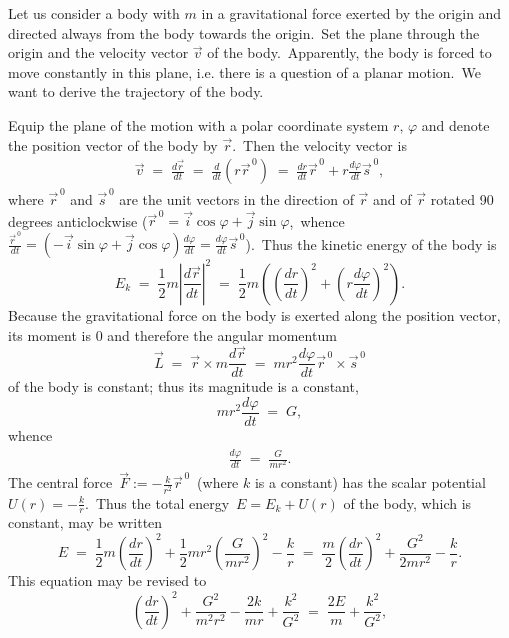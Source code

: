 \documentclass[12pt]{article}
\begin{document}
  
  
Let us consider a body with  $m$ in a gravitational force  exerted by the origin and directed always from the body towards the origin.\, Set the plane through the origin and the velocity vector $\vec{v}$ of the body.\, Apparently, the body is forced to move constantly in this plane, i.e. there is a question of a planar motion.\, We want to derive the trajectory of the body.

Equip the plane of the motion with a polar coordinate system $r,\,\varphi$ and denote the position vector of the body by $\vec{r}$.\, Then the velocity vector is
\begin{align}
\vec{v} \;=\; \frac{d\vec{r}}{dt} \;=\; \frac{d}{dt}(r\vec{r}^{\,0}) 
\;=\; \frac{dr}{dt}\vec{r}^{\,0}+r\frac{d\varphi}{dt}\vec{s}^{\,0},
\end{align}
where $\vec{r}^{\,0}$ and $\vec{s}^{\,0}$ are the unit vectors in the direction of $\vec{r}$ and of $\vec{r}$ rotated 90 degrees anticlockwise ($\vec{r}^{\,0} = \vec{i}\cos\varphi+\vec{j}\sin\varphi$,\, whence\, $\frac{\vec{r}^{\,0}}{dt} = 
(-\vec{i}\sin\varphi+\vec{j}\cos\varphi)\frac{d\varphi}{dt} = \frac{d\varphi}{dt}\vec{s}^{\,0}$).\, Thus the kinetic energy of the body is
$$E_k \;=\; \frac{1}{2}m\left|\frac{d\vec{r}}{dt}\right|^2 
\;=\; \frac{1}{2}m\left(\!\left(\frac{dr}{dt}\right)^2\!+\!\left(r\frac{d\varphi}{dt}\right)^2\right)\!.$$
Because the gravitational force on the body is exerted along the position vector, its moment is 0 and therefore the angular momentum 
$$\vec{L} \;=\; \vec{r}\!\times\!m\frac{d\vec{r}}{dt} 
\;=\; mr^2\frac{d\varphi}{dt}\vec{r}^{\,0}\!\times\!\vec{s}^{\,0}$$
of the body is constant; thus its magnitude is a constant,
$$mr^2\frac{d\varphi}{dt} \;=\; G,$$
whence
\begin{align}
\frac{d\varphi}{dt} \;=\; \frac{G}{mr^2}.
\end{align}
The central force\, $\displaystyle\vec{F} := -\frac{k}{r^2}\vec{r}^{\,0}$\, (where $k$ is a constant) has the scalar potential \, $U(r) = -\frac{k}{r}$.\, Thus the total energy\, $E = E_k\!+\!U(r)$ of the body, which is constant, may be written
$$E \;=\; \frac{1}{2}m\!\left(\frac{dr}{dt}\right)^2\!+\frac{1}{2}mr^2\!\left(\frac{G}{mr^2}\right)^2\!-\!\frac{k}{r} 
\;=\; \frac{m}{2}\!\left(\frac{dr}{dt}\right)^2\!+\frac{G^2}{2mr^2}\!-\!\frac{k}{r}.$$
This equation may be revised to
$$\left(\frac{dr}{dt}\right)^2\!+\frac{G^2}{m^2r^2}-\frac{2k}{mr}+\frac{k^2}{G^2} \;=\; \frac{2E}{m}+\frac{k^2}{G^2},$$
\end{document}
